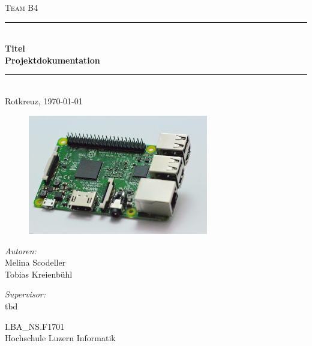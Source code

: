 \begin{titlepage}   

\begin{center}
\textsc{\Large Team B4}\\[0.5cm]

\newcommand{\HRule}{\rule{\linewidth}{0.5mm}}
\HRule \\[0.4cm]
{ \huge \bfseries Titel}\\[0.4cm]
{ \LARGE \bfseries Projektdokumentation}\\[0.4cm]
\HRule \\[1.5cm]

{\large Rotkreuz, \today}

\begin{figure}[H]%
\centering
\includegraphics[width=0.7\textwidth]{Images/Titelbild.jpg}
\label{fig:title}
\end{figure}
\begin{minipage}{0.4\textwidth}
\begin{flushleft} \large
\emph{Autoren:}\\
Melina Scodeller\\
Tobias Kreienbühl\\
\end{flushleft}
\end{minipage}
\hfill
\begin{minipage}{0.4\textwidth}
\begin{flushright} \large
\emph{Supervisor:} \\
tbd
\end{flushright}
\end{minipage}
\large
\vfill
I.BA\_NS.F1701 \\
Hochschule Luzern Informatik

\end{center}

\end{titlepage}
